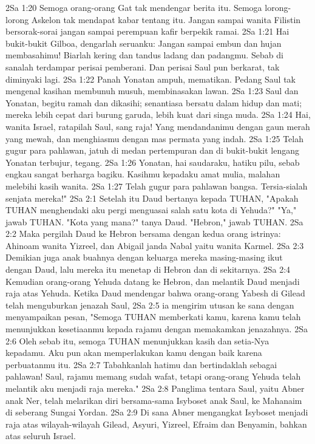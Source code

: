 2Sa 1:20  Semoga orang-orang Gat tak mendengar berita itu. Semoga lorong-lorong Askelon tak mendapat kabar tentang itu. Jangan sampai wanita Filistin bersorak-sorai jangan sampai perempuan kafir berpekik ramai.
2Sa 1:21  Hai bukit-bukit Gilboa, dengarlah seruanku: Jangan sampai embun dan hujan membasahimu! Biarlah kering dan tandus ladang dan padangmu. Sebab di sanalah terdampar perisai pemberani. Dan perisai Saul pun berkarat, tak diminyaki lagi.
2Sa 1:22  Panah Yonatan ampuh, mematikan. Pedang Saul tak mengenal kasihan membunuh musuh, membinasakan lawan.
2Sa 1:23  Saul dan Yonatan, begitu ramah dan dikasihi; senantiasa bersatu dalam hidup dan mati; mereka lebih cepat dari burung garuda, lebih kuat dari singa muda.
2Sa 1:24  Hai, wanita Israel, ratapilah Saul, sang raja! Yang mendandanimu dengan gaun merah yang mewah, dan menghiasmu dengan mas permata yang indah.
2Sa 1:25  Telah gugur para pahlawan, jatuh di medan pertempuran dan di bukit-bukit lengang Yonatan terbujur, tegang.
2Sa 1:26  Yonatan, hai saudaraku, hatiku pilu, sebab engkau sangat berharga bagiku. Kasihmu kepadaku amat mulia, malahan melebihi kasih wanita.
2Sa 1:27  Telah gugur para pahlawan bangsa. Tersia-sialah senjata mereka!"
2Sa 2:1  Setelah itu Daud bertanya kepada TUHAN, "Apakah TUHAN menghendaki aku pergi menguasai salah satu kota di Yehuda?" "Ya," jawab TUHAN. "Kota yang mana?" tanya Daud. "Hebron," jawab TUHAN.
2Sa 2:2  Maka pergilah Daud ke Hebron bersama dengan kedua orang istrinya: Ahinoam wanita Yizreel, dan Abigail janda Nabal yaitu wanita Karmel.
2Sa 2:3  Demikian juga anak buahnya dengan keluarga mereka masing-masing ikut dengan Daud, lalu mereka itu menetap di Hebron dan di sekitarnya.
2Sa 2:4  Kemudian orang-orang Yehuda datang ke Hebron, dan melantik Daud menjadi raja atas Yehuda. Ketika Daud mendengar bahwa orang-orang Yabesh di Gilead telah menguburkan jenazah Saul,
2Sa 2:5  ia mengirim utusan ke sana dengan menyampaikan pesan, "Semoga TUHAN memberkati kamu, karena kamu telah menunjukkan kesetiaanmu kepada rajamu dengan memakamkan jenazahnya.
2Sa 2:6  Oleh sebab itu, semoga TUHAN menunjukkan kasih dan setia-Nya kepadamu. Aku pun akan memperlakukan kamu dengan baik karena perbuatanmu itu.
2Sa 2:7  Tabahkanlah hatimu dan bertindaklah sebagai pahlawan! Saul, rajamu memang sudah wafat, tetapi orang-orang Yehuda telah melantik aku menjadi raja mereka."
2Sa 2:8  Panglima tentara Saul, yaitu Abner anak Ner, telah melarikan diri bersama-sama Isyboset anak Saul, ke Mahanaim di seberang Sungai Yordan.
2Sa 2:9  Di sana Abner mengangkat Isyboset menjadi raja atas wilayah-wilayah Gilead, Asyuri, Yizreel, Efraim dan Benyamin, bahkan atas seluruh Israel.
